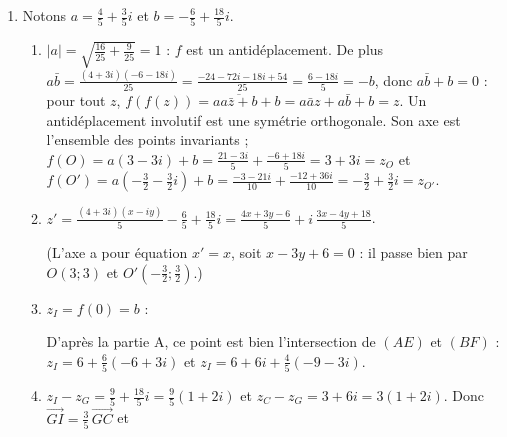 \begin{description}
\begin{enumerate}
\begin{enumerate}
		\end{enumerate}
		\item Notons $a = \frac{4}{5} + \frac{3}{5} i$ et $b = -\frac{6}{5} + \frac{18}{5} i$.
		\begin{enumerate}
			\item {}
				$|a| = \sqrt{\frac{16}{25} + \frac{9}{25}} = 1$ : $f$ est un antidéplacement. De plus
				$a\bar{b} = \frac{(4 + 3i)(-6 - 18i)}{25} = \frac{-24 - 72i - 18i + 54}{25} = \frac{6 - 18i}{5} = -b$,
				donc $a\bar{b} + b = 0$ : pour tout $z$, $f(f(z)) = a\overline{a\bar{z} + b} + b = a\bar{a} z + a\bar{b} + b = z$.
				Un antidéplacement involutif est une symétrie orthogonale. Son axe est l'ensemble des points invariants ;
				$f(O) = a(3 - 3i) + b = \frac{21 - 3i}{5} + \frac{-6 + 18i}{5} = 3 + 3i = z_O$ et
				$f(O') = a\left(-\frac{3}{2} - \frac{3}{2}i\right) + b = \frac{-3 - 21i}{10} + \frac{-12 + 36i}{10} = -\frac{3}{2} + \frac{3}{2}i = z_{O'}$.
				\par\noindent{}
			\item {}
				$z' = \frac{(4 + 3i)(x - iy)}{5} - \frac{6}{5} + \frac{18}{5} i = \frac{4x + 3y - 6}{5} + i\, \frac{3x - 4y + 18}{5}$.
				\par\noindent{}
				(L'axe a pour équation $x' = x$, soit $x - 3y + 6 = 0$ : il passe bien par $O(3;3)$ et $O'\left(-\frac{3}{2};\frac{3}{2}\right)$.)
			\item {}
				$z_I = f(0) = b$ : \par\noindent{}
				D'après la partie A, ce point est bien l'intersection de $(AE)$ et $(BF)$ :
				$z_I = 6 + \frac{6}{5}(-6 + 3i)$ et $z_I = 6 + 6i + \frac{4}{5}(-9 - 3i)$.
			\item {}
				$z_I - z_G = \frac{9}{5} + \frac{18}{5} i = \frac{9}{5}(1 + 2i)$ et $z_C - z_G = 3 + 6i = 3(1 + 2i)$.
				Donc $\overrightarrow{GI} = \frac{3}{5}\, \overrightarrow{GC}$ et \par\noindent{}
		\end{enumerate}
	\end{enumerate}
\end{description}
